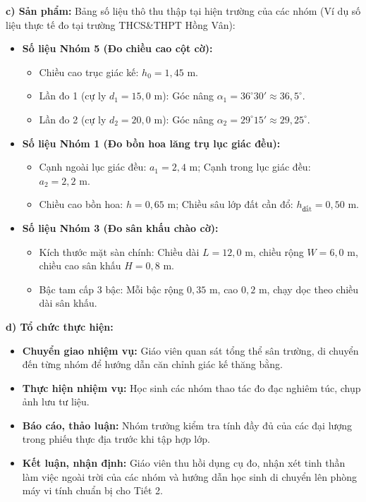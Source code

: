 \documentclass[12pt, a4paper]{article}
\begin{document}
\noindent \textbf{c) Sản phẩm:}
Bảng số liệu thô thu thập tại hiện trường của các nhóm (Ví dụ số liệu thực tế đo tại trường THCS\&THPT Hồng Vân):
\begin{itemize}[leftmargin=0.6cm]
    \item \textbf{Số liệu Nhóm 5 (Đo chiều cao cột cờ):}
    \begin{itemize}
        \item Chiều cao trục giác kế: $h_0 = 1{,}45\text{ m}$.
        \item Lần đo 1 (cự ly $d_1 = 15{,}0\text{ m}$): Góc nâng $\alpha_1 = 36^\circ 30' \approx 36{,}5^\circ$.
        \item Lần đo 2 (cự ly $d_2 = 20{,}0\text{ m}$): Góc nâng $\alpha_2 = 29^\circ 15' \approx 29{,}25^\circ$.
    \end{itemize}
    \item \textbf{Số liệu Nhóm 1 (Đo bồn hoa lăng trụ lục giác đều):}
    \begin{itemize}
        \item Cạnh ngoài lục giác đều: $a_1 = 2{,}4\text{ m}$; Cạnh trong lục giác đều: $a_2 = 2{,}2\text{ m}$.
        \item Chiều cao bồn hoa: $h = 0{,}65\text{ m}$; Chiều sâu lớp đất cần đổ: $h_{\text{đất}} = 0{,}50\text{ m}$.
    \end{itemize}
    \item \textbf{Số liệu Nhóm 3 (Đo sân khấu chào cờ):}
    \begin{itemize}
        \item Kích thước mặt sàn chính: Chiều dài $L = 12{,}0\text{ m}$, chiều rộng $W = 6{,}0\text{ m}$, chiều cao sân khấu $H = 0{,}8\text{ m}$.
        \item Bậc tam cấp 3 bậc: Mỗi bậc rộng $0{,}35\text{ m}$, cao $0{,}2\text{ m}$, chạy dọc theo chiều dài sân khấu.
    \end{itemize}
\end{itemize}

\noindent \textbf{d) Tổ chức thực hiện:}
\begin{itemize}[leftmargin=0.6cm]
    \item \textbf{Chuyển giao nhiệm vụ:} Giáo viên quan sát tổng thể sân trường, di chuyển đến từng nhóm để hướng dẫn căn chỉnh giác kế thăng bằng.
    \item \textbf{Thực hiện nhiệm vụ:} Học sinh các nhóm thao tác đo đạc nghiêm túc, chụp ảnh lưu tư liệu.
    \item \textbf{Báo cáo, thảo luận:} Nhóm trưởng kiểm tra tính đầy đủ của các đại lượng trong phiếu thực địa trước khi tập hợp lớp.
    \item \textbf{Kết luận, nhận định:} Giáo viên thu hồi dụng cụ đo, nhận xét tinh thần làm việc ngoài trời của các nhóm và hướng dẫn học sinh di chuyển lên phòng máy vi tính chuẩn bị cho Tiết 2.
\end{itemize}
\end{document}
